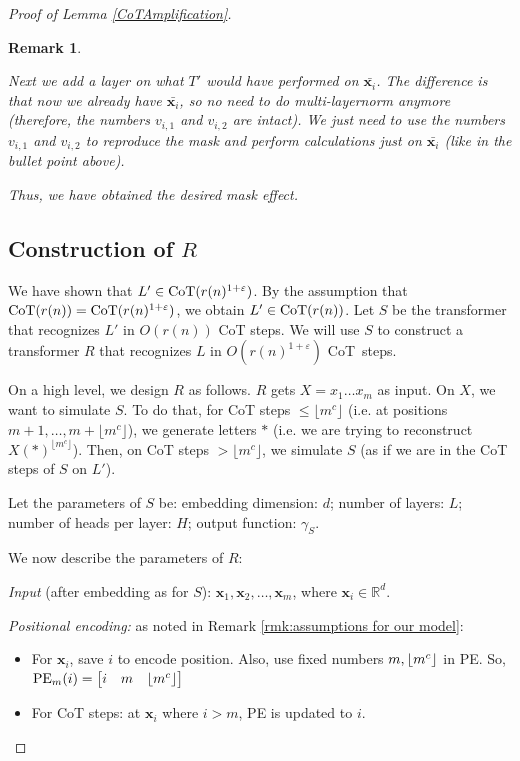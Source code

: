 \documentclass{article}
\let\epsilon\varepsilon
\newtheorem{remark}[theorem]{Remark}
\theoremstyle{definition}
\DeclarePairedDelimiter{\floor}{\lfloor}{\rfloor}
\newcommand{\R}{\mathbb{R}}
\newcommand{\x}{\mathbf{x}}
\newcommand{\0}{\mathbf{0}}
\newcommand{\CoT}{\mbox{\rm CoT}}
\newcommand{\PE}{\text{PE}}
\newcommand{\1}{\mathbbm{1}}
\begin{document}
\begin{proof}[Proof of Lemma \ref{CoTAmplification}]
\begin{remark}
\begin{itemize}
 		Next we add a layer on what $T'$ would have performed on $\bar{\x_i}$. The difference is that now we already have $\bar{\x_i}$, so no need to do multi-layernorm anymore (therefore, the numbers $v_{i,1}$ and $v_{i,2}$ are intact). We just need to use the numbers $v_{i,1}$ and $v_{i,2}$ to reproduce the mask and perform calculations just on $\bar{\x_i}$ (like in the bullet point above).   
 		
 		
 		Thus, we have obtained the desired mask effect. 
 	\end{itemize} 
\end{remark}

\subsection{\texorpdfstring{Construction of $R$}{Construction of R}} %
    We have shown that $L' \in \CoT(r(n)^{1+\varepsilon})$. By the assumption that $\CoT(r(n)) = \CoT(r(n)^{1+\varepsilon})$, we obtain  $L' \in \CoT(r(n))$. Let $S$ be the transformer that recognizes $L'$ in $O(r(n))$ CoT steps.  We will use $S$ to construct a transformer $R$ that recognizes $L$ in $O(r(n)^{1+\epsilon})$ \CoT\ steps. 

    On a high level, we design $R$ as follows. $R$ gets $X = x_1 \dots x_m$ as input. On $X$, we want to simulate $S$. To do that, for CoT steps $\leq \lfloor m^c \rfloor$ (i.e. at positions $m+1, \dots, m + \lfloor m^c \rfloor$), we generate letters $*$ (i.e. we are trying to reconstruct $X (*)^{\lfloor m^c\rfloor}$). Then, on CoT steps $> \lfloor m^c\rfloor$, we simulate $S$ (as if we are in the CoT steps of $S$ on $L'$).  

    Let the parameters of $S$ be: embedding dimension: $d$; number of layers: $L$; number of heads per layer: $H$; output function: $\gamma_S$. 

   We now describe the parameters of $R$: 
        
        {\em Input} (after embedding as for $S$): $\x_1, \x_2, \dots, \x_m$, where $\x_i \in \R^d$.  


        {\em Positional encoding:} as noted in Remark \ref{rmk:assumptions for our model}: 
        \begin{itemize}[noitemsep,leftmargin=10pt,topsep=0pt]
            \item For $\x_i$, save $i$ to encode position. Also, use fixed numbers $m, \floor{m^c}$ in PE. So, $\PE_m(i) = \begin{bmatrix}
                i &m &\floor{m^c}
            \end{bmatrix}$
            \item For CoT steps: at $\x_i$ where $i > m$, PE is updated to $i$. %
        \end{itemize}


\end{proof}
\end{document}
